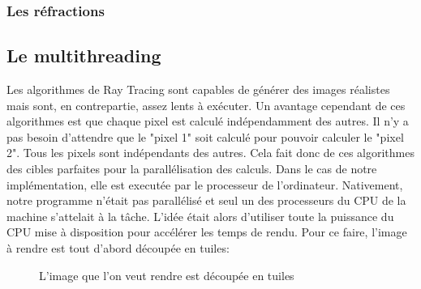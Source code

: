 \documentclass[11pt]{article}
\begin{document}
\subsubsection{Les réfractions}

\subsection{Le multithreading}

Les algorithmes de Ray Tracing sont capables de générer des images réalistes mais sont, en contrepartie, assez lents à exécuter. Un avantage cependant de ces algorithmes est que chaque pixel est calculé indépendamment des autres. Il n'y a pas besoin d'attendre que le "pixel 1" soit calculé pour pouvoir calculer le "pixel 2". Tous les pixels sont indépendants des autres. Cela fait donc de ces algorithmes des cibles parfaites pour la parallélisation des calculs. Dans le cas de notre implémentation, elle est executée par le processeur de l'ordinateur. Nativement, notre programme n'était pas parallélisé et seul un des processeurs du CPU de la machine s'attelait à la tâche. L'idée était alors d'utiliser toute la puissance du CPU mise à disposition pour accélérer les temps de rendu. Pour ce faire, l'image à rendre est tout d'abord découpée en tuiles:

\begin{figure}[h!]

	\caption{L'image que l'on veut rendre est découpée en tuiles}
	\label{grilleMultithreading}
\end{figure}
\FloatBarrier
\end{document}
